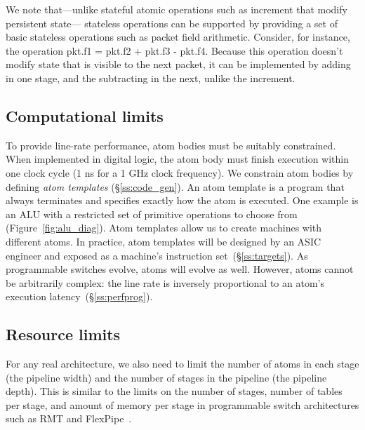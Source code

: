 We note that---unlike stateful atomic operations such as increment
that modify persistent state--- stateless operations can be supported
by providing a set of basic stateless operations such as packet field
arithmetic. Consider, for instance, the operation pkt.f1 = pkt.f2 +
pkt.f3 - pkt.f4. Because this operation doesn't modify state that is
visible to the next packet, it can be implemented by adding in one
stage, and the subtracting in the next, unlike the increment.

\subsection{Computational limits}
\label{s:atomConstraints}


To provide line-rate performance, atom bodies must be suitably
constrained.  When implemented in digital logic, the atom body must
finish execution within one clock cycle (1 ns for a 1 GHz clock
frequency). We constrain atom bodies by defining {\it atom templates}
(\S\ref{ss:code_gen}).  An atom template is a program that always
terminates and specifies exactly how the atom is executed. One example
is an ALU with a restricted set of primitive operations to choose from
(Figure~\ref{fig:alu_diag}). Atom templates allow us to create
\absmachine machines with different atoms.  In practice, atom
templates will be designed by an ASIC engineer and exposed as a
machine's instruction set~(\S\ref{ss:targets}).  As programmable
switches evolve, atoms will evolve as well.  However, atoms cannot be
arbitrarily complex: the line rate is inversely proportional to an
atom's execution latency~(\S\ref{ss:perfprog}).

\subsection{Resource limits}
\label{s:resource}

For any real architecture, we also need to limit the number of atoms
in each stage (the pipeline width) and the number of stages in the
pipeline (the pipeline depth). This is similar to the limits on the
number of stages, number of tables per stage, and amount of memory per
stage in programmable switch architectures such as RMT and
FlexPipe~\cite{lavanya_compiler}.
